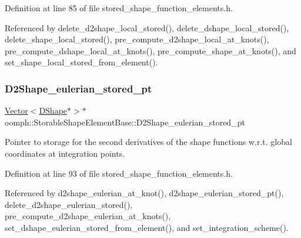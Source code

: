 Definition at line 85 of file stored\+\_\+shape\+\_\+function\+\_\+elements.\+h.



Referenced by delete\+\_\+d2shape\+\_\+local\+\_\+stored(), delete\+\_\+dshape\+\_\+local\+\_\+stored(), delete\+\_\+shape\+\_\+local\+\_\+stored(), pre\+\_\+compute\+\_\+d2shape\+\_\+local\+\_\+at\+\_\+knots(), pre\+\_\+compute\+\_\+dshape\+\_\+local\+\_\+at\+\_\+knots(), pre\+\_\+compute\+\_\+shape\+\_\+at\+\_\+knots(), and set\+\_\+shape\+\_\+local\+\_\+stored\+\_\+from\+\_\+element().

\mbox{\label{classoomph_1_1StorableShapeElementBase_a46f6e7962305b650b731de246ea35045}} 
\subsubsection{\texorpdfstring{D2\+Shape\+\_\+eulerian\+\_\+stored\+\_\+pt}{D2Shape\_eulerian\_stored\_pt}}
{\footnotesize\ttfamily \hyperlink{classoomph_1_1Vector}{Vector}$<$\hyperlink{classoomph_1_1DShape}{D\+Shape}$\ast$$>$$\ast$ oomph\+::\+Storable\+Shape\+Element\+Base\+::\+D2\+Shape\+\_\+eulerian\+\_\+stored\+\_\+pt\hspace{0.3cm}{\ttfamily [private]}}



Pointer to storage for the second derivatives of the shape functions w.\+r.\+t. global coordinates at integration points. 



Definition at line 93 of file stored\+\_\+shape\+\_\+function\+\_\+elements.\+h.



Referenced by d2shape\+\_\+eulerian\+\_\+at\+\_\+knot(), d2shape\+\_\+eulerian\+\_\+stored\+\_\+pt(), delete\+\_\+d2shape\+\_\+eulerian\+\_\+stored(), pre\+\_\+compute\+\_\+d2shape\+\_\+eulerian\+\_\+at\+\_\+knots(), set\+\_\+dshape\+\_\+eulerian\+\_\+stored\+\_\+from\+\_\+element(), and set\+\_\+integration\+\_\+scheme().

\mbox{\label{classoomph_1_1StorableShapeElementBase_a394af13fdd8588c660171e40044e6c48}} 
